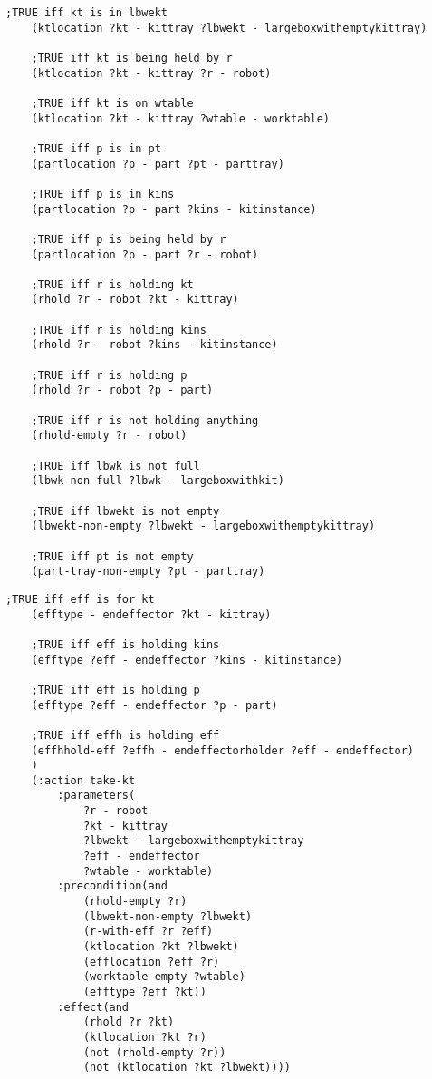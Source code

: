 \begin{appendices}
\begin{minipage}{.5\paperwidth}
\begin{mylisting}
\begin{Verbatim}[commandchars=\\\{\},commandchars=+\[\],fontsize=\small,numbersep=3pt]
	;TRUE iff kt is in lbwekt				
	(ktlocation ?kt - kittray ?lbwekt - largeboxwithemptykittray)	

	;TRUE iff kt is being held by r
	(ktlocation ?kt - kittray ?r - robot)					
		
	;TRUE iff kt is on wtable
	(ktlocation ?kt - kittray ?wtable - worktable)
	
	;TRUE iff p is in pt
	(partlocation ?p - part ?pt - parttray)					
	
	;TRUE iff p is in kins
	(partlocation ?p - part ?kins - kitinstance)			
		
	;TRUE iff p is being held by r
	(partlocation ?p - part ?r - robot)	

	;TRUE iff r is holding kt						
	(rhold ?r - robot ?kt - kittray)	

	;TRUE iff r is holding kins					
	(rhold ?r - robot ?kins - kitinstance)				
		
	;TRUE iff r is holding p
	(rhold ?r - robot ?p - part)					
			
	;TRUE iff r is not holding anything
	(rhold-empty ?r - robot)							
			
	;TRUE iff lbwk is not full
	(lbwk-non-full ?lbwk - largeboxwithkit)
		
	;TRUE iff lbwekt is not empty
	(lbwekt-non-empty ?lbwekt - largeboxwithemptykittray)	
	
	;TRUE iff pt is not empty		
	(part-tray-non-empty ?pt - parttray)
\end{Verbatim}
\end{mylisting}
\end{minipage}

\begin{minipage}{.5\paperwidth}
\begin{mylisting}
\begin{Verbatim}[commandchars=\\\{\},commandchars=+\[\],fontsize=\small,numbersep=3pt]
	;TRUE iff eff is for kt						
	(efftype - endeffector ?kt - kittray)

	;TRUE iff eff is holding kins			
	(efftype ?eff - endeffector ?kins - kitinstance)	
	
	;TRUE iff eff is holding p
	(efftype ?eff - endeffector ?p - part)

	;TRUE iff effh is holding eff				
	(effhhold-eff ?effh - endeffectorholder ?eff - endeffector)			
    )
	(:action take-kt
		:parameters(
			?r - robot
			?kt - kittray
			?lbwekt - largeboxwithemptykittray
			?eff - endeffector
			?wtable - worktable)
		:precondition(and
			(rhold-empty ?r)
			(lbwekt-non-empty ?lbwekt)
			(r-with-eff ?r ?eff)
			(ktlocation ?kt ?lbwekt)
			(efflocation ?eff ?r)
			(worktable-empty ?wtable)
			(efftype ?eff ?kt))
		:effect(and
			(rhold ?r ?kt)
			(ktlocation ?kt ?r)
			(not (rhold-empty ?r))
			(not (ktlocation ?kt ?lbwekt))))
			

\end{Verbatim}
\end{mylisting}
\end{minipage}
\end{appendices}
